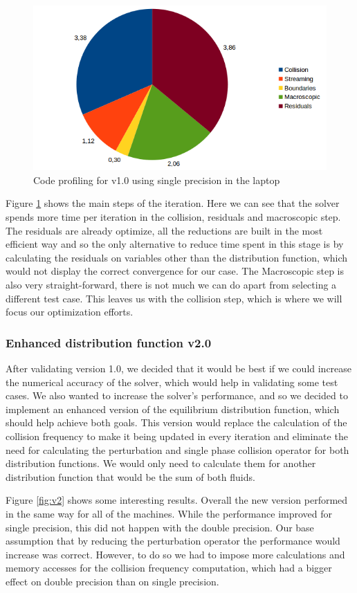 \documentclass[12pt]{book}
\begin{document}
    \begin{figure}[H]
    	\centering
    	\includegraphics[width=\linewidth]{Resources/Images/v1profile.png}
    	\caption{Code profiling for v1.0 using single precision in the laptop}
    	\label{fig:v1profile}
    \end{figure}
    
    Figure \ref{fig:v1profile} shows the main steps of the iteration. Here we can see that the solver spends more time per iteration in the collision, residuals and macroscopic step. The residuals are already optimize, all the reductions are built in the most efficient way and so the only alternative to reduce time spent in this stage is by calculating the residuals on variables other than the distribution function, which would not display the correct convergence for our case. The Macroscopic step is also very straight-forward, there is not much we can do apart from selecting a different test case. This leaves us with the collision step, which is where we will focus our optimization efforts.
  
\subsubsection{Enhanced distribution function v2.0}
After validating version 1.0, we decided that it would be best if we could increase the numerical accuracy of the solver, which would help in validating some test cases. We also wanted to increase the solver's performance, and so we decided to implement an enhanced version of the equilibrium distribution function, which should help achieve both goals. This version would replace the calculation of the collision frequency to make it being updated in every iteration and eliminate the need for calculating the perturbation and single phase collision operator for both distribution functions. We would only need to calculate them for another distribution function that would be the sum of both fluids.\par
  Figure \ref{fig:v2} shows some interesting results. Overall the new version performed in the same way for all of the machines. While the performance improved for single precision, this did not happen with the double precision. Our base assumption that by reducing the perturbation operator the performance would increase was correct. However, to do so we had to impose more calculations and memory accesses for the collision frequency computation, which had a bigger effect on double precision than on single precision. 
\end{document}

